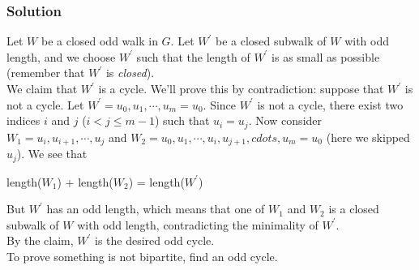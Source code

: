 \documentclass{report}
\begin{document}
\subsubsection{Solution}
Let $W$ be a closed odd walk in $G$. Let $W^\prime$ be a closed subwalk of $W$ with odd length, and we choose $W^\prime$ such that the length of $W^\prime$ is as small as possible (remember that $W^\prime$ is \textit{closed}).\\
We claim that $W^\prime$ is a cycle. We'll prove this by contradiction: suppose that $W^\prime$ is not a cycle. Let $W^\prime = u_0, u_1, \cdots, u_m = u_0$. Since $W^\prime$ is not a cycle, there exist two indices $i$ and $j$ ($i < j \leq m-1$) such that $u_i = u_j$. Now consider $W_1 = u_i, u_{i+1}, \cdots, u_j$ and $W_2 = u_0, u_1, \cdots, u_i, u_{j+1}, cdots, u_m=u_0$ (here we skipped $u_j$). We see that
\begin{center}
length($W_1$) + length($W_2$) = length($W^\prime$)
\end{center}
But $W^\prime$ has an odd length, which means that one of $W_1$ and $W_2$ is a closed subwalk of $W$ with odd length, contradicting the minimality of $W^\prime$.\\
By the claim, $W^\prime$ is the desired odd cycle.\\
To prove something is not bipartite, find an odd cycle.
\end{document}
